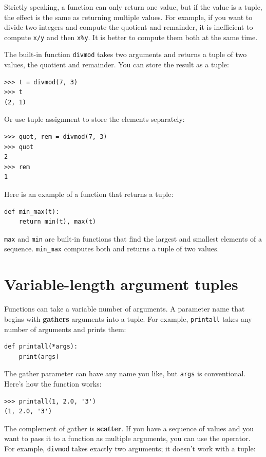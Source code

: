 \documentclass[10pt]{book}
\begin{document}
Strictly speaking, a function can only return one value, but
if the value is a tuple, the effect is the same as returning
multiple values.  For example, if you want to divide two integers
and compute the quotient and remainder, it is inefficient to
compute {\tt x/y} and then {\tt x\%y}.  It is better to compute
them both at the same time.

The built-in function {\tt divmod} takes two arguments and
returns a tuple of two values, the quotient and remainder.
You can store the result as a tuple:

\begin{verbatim}
>>> t = divmod(7, 3)
>>> t
(2, 1)
\end{verbatim}
%
Or use tuple assignment to store the elements separately:

\begin{verbatim}
>>> quot, rem = divmod(7, 3)
>>> quot
2
>>> rem
1
\end{verbatim}
%
Here is an example of a function that returns a tuple:

\begin{verbatim}
def min_max(t):
    return min(t), max(t)
\end{verbatim}
%
{\tt max} and {\tt min} are built-in functions that find
the largest and smallest elements of a sequence.  \verb"min_max"
computes both and returns a tuple of two values.


\section{Variable-length argument tuples}
\label{gather}

Functions can take a variable number of arguments.  A parameter
name that begins with {\tt *} {\bf gathers} arguments into
a tuple.  For example, {\tt printall}
takes any number of arguments and prints them:

\begin{verbatim}
def printall(*args):
    print(args)
\end{verbatim}
%
The gather parameter can have any name you like, but {\tt args} is
conventional.  Here's how the function works:

\begin{verbatim}
>>> printall(1, 2.0, '3')
(1, 2.0, '3')
\end{verbatim}
%
The complement of gather is {\bf scatter}.  If you have a
sequence of values and you want to pass it to a function
as multiple arguments, you can use the {\tt *} operator.
For example, {\tt divmod} takes exactly two arguments; it
doesn't work with a tuple:
\end{document}

